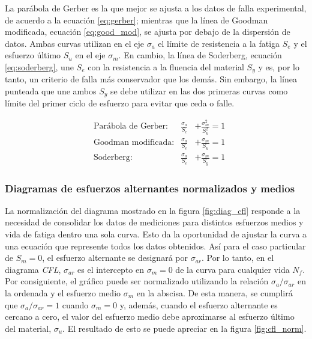 La parábola de Gerber es la que mejor se ajusta a los datos de falla experimental, de acuerdo a la ecuación \ref{eq:gerber}; mientras que la línea de Goodman modificada, ecuación \ref{eq:good_mod}, se ajusta por debajo de la dispersión de datos. Ambas curvas utilizan en el eje $\sigma_a$ el límite de resistencia a la fatiga $S_e$ y el esfuerzo último $S_u$ en el eje $\sigma_m$. En cambio, la línea de Soderberg, ecuación \ref{eq:soderberg}, une $S_e$ con la resistencia a la fluencia del material $S_y$ y es, por lo tanto, un criterio de falla más conservador que los demás. Sin embargo, la línea punteada que une ambos $S_y$ se debe utilizar en las dos primeras curvas como límite del primer ciclo de esfuerzo para evitar que ceda o falle. \cite{norton2011machine}

\begin{centering}
\begin{align}
&\text{Parábola de Gerber:}&	\frac{\sigma_a}{S_e} &+ \frac{\sigma_m^2}{S_u^2} = 1 \label{eq:gerber}\\
&\text{Goodman modificada:}&	\frac{\sigma_a}{S_e} &+ \frac{\sigma_m}{S_u} = 1 \label{eq:good_mod}\\
&\text{Soderberg:}&	\frac{\sigma_a}{S_e} &+ \frac{\sigma_m}{S_y} = 1 \label{eq:soderberg}
\end{align}
\end{centering}

\newpage

\subsubsection{Diagramas de esfuerzos alternantes normalizados y medios}

La normalización del diagrama mostrado en la figura \ref{fig:diag_cfl} responde a la necesidad de consolidar los datos de mediciones para distintos esfuerzos medios y vida de fatiga dentro una sola curva. Esto da la oportunidad de ajustar la curva a una ecuación que represente todos los datos obtenidos. Así para el caso particular de $S_m=0$, el esfuerzo alternante se designará por $\sigma_{ar}$. Por lo tanto, en el diagrama \textit{CFL}, $\sigma_{ar}$ es el intercepto en $\sigma_m=0$ de la curva para cualquier vida $N_f$. Por consiguiente, el gráfico puede ser normalizado utilizando la relación $\sigma_a/\sigma_{ar}$ en la ordenada y el esfuerzo medio $\sigma_m$ en la abscisa. De esta manera, se cumplirá que $\sigma_a/\sigma_{ar}=1$ cuando $\sigma_m=0$ y, además, cuando el esfuerzo alternante es cercano a cero, el valor del esfuerzo medio debe aproximarse al esfuerzo último del material, $\sigma_u$. El resultado de esto se puede apreciar en la figura \ref{fig:cfl_norm}.

